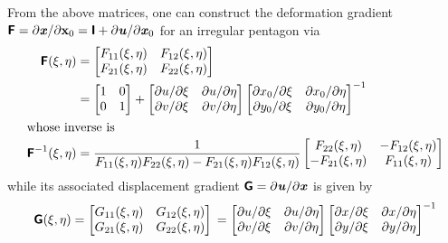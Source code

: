 From the above matrices, one can construct the deformation gradient $\boldsymbol{\mathsf{F}} = \partial \boldsymbol{\mathit{x}} / \partial \mathbf{x}_0 = \boldsymbol{\mathsf{I}} + \partial \boldsymbol{\mathit{u}} / \partial \boldsymbol{\mathit{x}}_0$ for an irregular pentagon via
\begin{subequations}
    \label{deformationGradient}
    \begin{align}
\boldsymbol{\mathsf{F}} (\xi, \eta) & = 
\begin{bmatrix}
F_{11}(\xi, \eta) & F_{12}(\xi, \eta) \\
F_{21}(\xi, \eta) & F_{22}(\xi, \eta)
\end{bmatrix} \notag \\ & = 
\begin{bmatrix}
1 & 0 \\
0 & 1
\end{bmatrix} + 
\begin{bmatrix}
\partial u / \partial \xi & \partial u / \partial \eta \\
\partial v / \partial \xi & \partial v / \partial \eta
\end{bmatrix}
\begin{bmatrix}
\partial x_0 / \partial \xi & \partial x_0 / \partial \eta \\
\partial y_0 / \partial \xi & \partial y_0 / \partial \eta
\end{bmatrix}^{-1} \\
\intertext{whose inverse is}
\boldsymbol{\mathsf{F}}^{-1} (\xi, \eta) & =
\frac{1}{F_{11} (\xi, \eta) F_{22} (\xi, \eta) - 
    F_{21} (\xi, \eta) F_{12} (\xi, \eta)}
\begin{bmatrix}
F_{22} (\xi, \eta) & -F_{12} (\xi, \eta) \\
-F_{21} (\xi, \eta) & F_{11} (\xi, \eta)
\end{bmatrix}
\end{align}
\end{subequations}
while its associated displacement gradient $\boldsymbol{\mathsf{G}} = \partial \boldsymbol{\mathit{u}} / \partial \boldsymbol{\mathit{x}}$ is given by
\begin{equation}
\mathbfsf{G} (\xi, \eta) = 
\begin{bmatrix}
G_{11}(\xi, \eta) & G_{12}(\xi, \eta) \\
G_{21}(\xi, \eta) & G_{22}(\xi, \eta)
\end{bmatrix} 
\mbox{} = 
\begin{bmatrix}
\partial u / \partial \xi & \partial u / \partial \eta \\
\partial v / \partial \xi & \partial v / \partial \eta
\end{bmatrix}
\begin{bmatrix}
\partial x / \partial \xi & \partial x / \partial \eta \\
\partial y / \partial \xi & \partial y / \partial \eta
\end{bmatrix}^{-1} 
\label{displacementGradient}
\end{equation}
